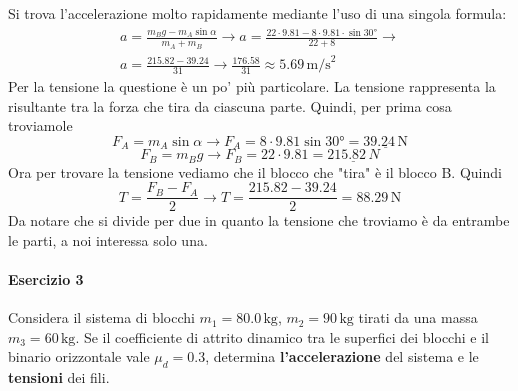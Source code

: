 Si trova l'accelerazione molto rapidamente mediante l'uso di una singola formula:
\begin{align*}
  a = \frac{m_Bg - m_A\sin\alpha}{m_A+m_B} \rightarrow a =
  \frac{22\cdot9.81-8\cdot9.81\cdot\sin\ang{30}}{22+8}\rightarrow\\
  a = \frac{215.82 - 39.24}{31} \rightarrow \frac{176.58}{31} \approx \boxed{5.69\,\text{m/s}^2}
\end{align*}
Per la tensione la questione è un po' più particolare. La tensione rappresenta la risultante
tra la forza che tira da ciascuna parte. Quindi, per prima cosa troviamole
\begin{equation*}
  F_A = m_A\sin\alpha \rightarrow F_A = 8\cdot9.81\sin\ang{30} = \underline{39.24\,\text{N}}
\end{equation*}
\begin{equation*}
  F_B = m_Bg \rightarrow F_B = 22\cdot9.81 = \underline{215.82\,N}
\end{equation*}
Ora per trovare la tensione vediamo che il blocco che "tira" è il blocco B. Quindi
\begin{equation*}
  T = \frac{F_B-F_A}{2} \rightarrow T = \frac{215.82-39.24}{2} = \boxed{88.29\,\text{N}}
\end{equation*}
Da notare che si divide per due in quanto la tensione che troviamo è da entrambe le parti, a noi
interessa solo una.

\paragraph{Esercizio 3}
Considera il sistema di blocchi $m_1 = 80.0\,\text{kg}$, $m_2 = 90\,\text{kg}$ tirati da una massa 
$m_3 = 60\,\text{kg}$. Se il coefficiente di attrito dinamico tra le superfici dei blocchi e il 
binario orizzontale vale $\mu_d = 0.3$, determina \textbf{l'accelerazione} del sistema e le 
\textbf{tensioni} dei fili.

\begin{center}
\end{center}
\divisor

